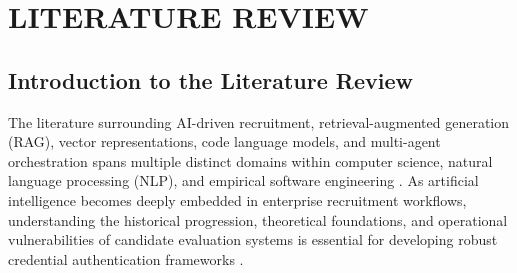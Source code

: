 \chapter{LITERATURE REVIEW}

\section{Introduction to the Literature Review}

The literature surrounding AI-driven recruitment, retrieval-augmented generation (RAG), vector representations, code language models, and multi-agent orchestration spans multiple distinct domains within computer science, natural language processing (NLP), and empirical software engineering \cite{ref1, ref4, ref33, ref44}. As artificial intelligence becomes deeply embedded in enterprise recruitment workflows, understanding the historical progression, theoretical foundations, and operational vulnerabilities of candidate evaluation systems is essential for developing robust credential authentication frameworks \cite{ref2, ref3, ref23}.

